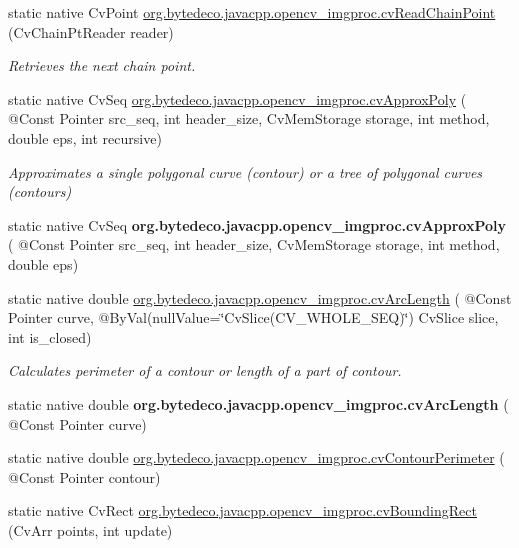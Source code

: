 \begin{DoxyCompactItemize}
static native Cv\+Point \hyperlink{group__imgproc__c_ga60ca24d0d962737958150406351d91c7}{org.\+bytedeco.\+javacpp.\+opencv\+\_\+imgproc.\+cv\+Read\+Chain\+Point} (Cv\+Chain\+Pt\+Reader reader)
\begin{DoxyCompactList}\small\item\em Retrieves the next chain point. \end{DoxyCompactList}\item 
static native Cv\+Seq \hyperlink{group__imgproc__c_ga04330d92548cde6503b33785252af580}{org.\+bytedeco.\+javacpp.\+opencv\+\_\+imgproc.\+cv\+Approx\+Poly} ( @Const Pointer src\+\_\+seq, int header\+\_\+size, Cv\+Mem\+Storage storage, int method, double eps, int recursive)
\begin{DoxyCompactList}\small\item\em Approximates a single polygonal curve (contour) or a tree of polygonal curves (contours) \end{DoxyCompactList}\item 
\mbox{\label{group__imgproc__c_ga1775ce0cb25cf8dd0960bdb260fb3c10}} 
static native Cv\+Seq {\bfseries org.\+bytedeco.\+javacpp.\+opencv\+\_\+imgproc.\+cv\+Approx\+Poly} ( @Const Pointer src\+\_\+seq, int header\+\_\+size, Cv\+Mem\+Storage storage, int method, double eps)
\item 
static native double \hyperlink{group__imgproc__c_gaf095420cca062536116edaad5f0391ae}{org.\+bytedeco.\+javacpp.\+opencv\+\_\+imgproc.\+cv\+Arc\+Length} ( @Const Pointer curve, @By\+Val(null\+Value=\char`\"{}Cv\+Slice(C\+V\+\_\+\+W\+H\+O\+L\+E\+\_\+\+S\+EQ)\char`\"{}) Cv\+Slice slice, int is\+\_\+closed)
\begin{DoxyCompactList}\small\item\em Calculates perimeter of a contour or length of a part of contour. \end{DoxyCompactList}\item 
\mbox{\label{group__imgproc__c_ga75289cca5f4a047ccbd0bcdb8e1a6fe3}} 
static native double {\bfseries org.\+bytedeco.\+javacpp.\+opencv\+\_\+imgproc.\+cv\+Arc\+Length} ( @Const Pointer curve)
\item 
static native double \hyperlink{group__imgproc__c_ga420bd05e2f839e52bdb1db41cea427af}{org.\+bytedeco.\+javacpp.\+opencv\+\_\+imgproc.\+cv\+Contour\+Perimeter} ( @Const Pointer contour)
\item 
static native Cv\+Rect \hyperlink{group__imgproc__c_ga83c0146f56d5c70d0eb462023220933e}{org.\+bytedeco.\+javacpp.\+opencv\+\_\+imgproc.\+cv\+Bounding\+Rect} (Cv\+Arr points, int update)

\end{DoxyCompactItemize}

